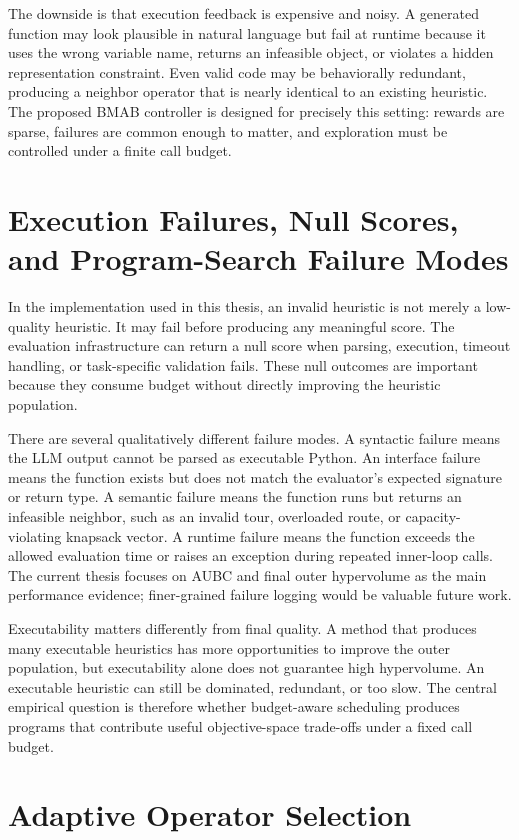 The downside is that execution feedback is expensive and noisy. A generated function may look plausible in natural language but fail at runtime because it uses the wrong variable name, returns an infeasible object, or violates a hidden representation constraint. Even valid code may be behaviorally redundant, producing a neighbor operator that is nearly identical to an existing heuristic. The proposed BMAB controller is designed for precisely this setting: rewards are sparse, failures are common enough to matter, and exploration must be controlled under a finite call budget.

\section{Execution Failures, Null Scores, and Program-Search Failure Modes}

In the implementation used in this thesis, an invalid heuristic is not merely a low-quality heuristic. It may fail before producing any meaningful score. The evaluation infrastructure can return a null score when parsing, execution, timeout handling, or task-specific validation fails. These null outcomes are important because they consume budget without directly improving the heuristic population.

There are several qualitatively different failure modes. A syntactic failure means the LLM output cannot be parsed as executable Python. An interface failure means the function exists but does not match the evaluator's expected signature or return type. A semantic failure means the function runs but returns an infeasible neighbor, such as an invalid tour, overloaded route, or capacity-violating knapsack vector. A runtime failure means the function exceeds the allowed evaluation time or raises an exception during repeated inner-loop calls. The current thesis focuses on AUBC and final outer hypervolume as the main performance evidence; finer-grained failure logging would be valuable future work.

Executability matters differently from final quality. A method that produces many executable heuristics has more opportunities to improve the outer population, but executability alone does not guarantee high hypervolume. An executable heuristic can still be dominated, redundant, or too slow. The central empirical question is therefore whether budget-aware scheduling produces programs that contribute useful objective-space trade-offs under a fixed call budget.

\section{Adaptive Operator Selection}

